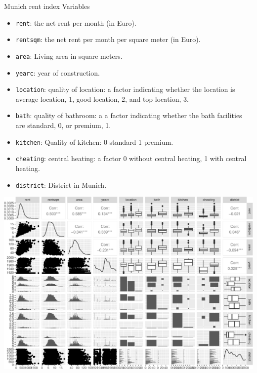 \documentclass[
  ignorenonframetext,
]{beamer}
\providecommand{\tightlist}{%
  \setlength{\itemsep}{0pt}\setlength{\parskip}{0pt}}
\begin{document}
\begin{frame}[fragile]
\begin{block}{Munich rent index Variables}
\label{munich-rent-index-variables}
\begin{itemize}
\tightlist
\item
  \texttt{rent}: the net rent per month (in Euro).
\item
  \texttt{rentsqm}: the net rent per month per square meter (in Euro).
\item
  \texttt{area}: Living area in square meters.
\item
  \texttt{yearc}: year of construction.
\item
  \texttt{location}: quality of location: a factor indicating whether
  the location is average location, 1, good location, 2, and top
  location, 3.
\item
  \texttt{bath}: quality of bathroom: a a factor indicating whether the
  bath facilities are standard, 0, or premium, 1.
\item
  \texttt{kitchen}: Quality of kitchen: 0 standard 1 premium.
\item
  \texttt{cheating}: central heating: a factor 0 without central
  heating, 1 with central heating.
\item
  \texttt{district}: District in Munich.
\end{itemize}
\end{block}
\end{frame}

\begin{frame}
\includegraphics{Module02MLRPresentationWeek1_files/figure-beamer/unnamed-chunk-1-1.pdf}
\end{frame}
\end{document}
